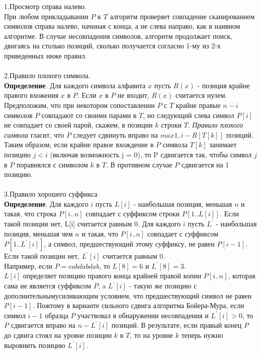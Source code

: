 \documentclass[a4paper,12pt]{article}
\begin{document}
1.Просмотр справа налево.\\
При любом прикладывании $P$ к $T$ алгоритм проверяет совпадение сканированием символов справа налево, начиная с конца, а не слева направо, как в наивном алгоритме.
В случае несовпадения символов, алгоритм продолжает поиск, двигаясь на столько позиций, сколько получается согласно 1-му из 2-х приведенных ниже правил. \\
\\
2.Правило плохого символа.\\
\textbf{Определение}. Для каждого символа алфавита $x$ пусть $R(x)$ - позиция крайне правого вхожения $x$ в $P$. Если $x$ в $P$ не входит, $R(x)$ считается нулем.\\
Предположим, что при некотором сопоставлении $P$ с $T$ крайне правые $n - i$ символов $P$ совпадают со своими парами в $T$, но следующий слева символ $P[i]$ не совпадает со своей парой, скажем, в позиции $k$ строки $T$. \textit{Правило плохого символа} гласит, что $P$ следует сдвинуть вправо на $max{1, i - R[T[k]]}$ позиций. Таким образом, если крайне правое вхождение в $P$ символа $T[k]$ занимает позицию $j < i$ (включая возможность j = 0), то P сдвигается так, чтобы символ $j$ в $P$ поравнялся с символом $k$ в $T$. В противном случае $P$ сдвигается на 1 позицию.\\
\\
3.Правило хорошего суффикса\\
\textbf{Определение}. Для каждого $i$ пусть $L[i]$ - наибольшая позиция, меньшая $n$ и такая, что строка $P[i..n]$ совпадает с суффиксом строки $P[1..L[i]]$. Если такой позиции нет, L[i] считается равным 0. Для каждого $i$ пусть $L^{\prime}$ - наибольшая позиция, меньшая чем $n$ и такая, что $P[i..n]$ совпадает с суффиксом $P[1..L^{\prime}[i]]$, а символ, предшествующий этому суффиксу, не равен $P[i - 1]$. Если такой позиции нет, $L^{\prime}[i]$ считается равным 0.\\ 
Например, если $P = cabdabdab$, то $L[8] = 6$ и $L^{\prime}[8] = 3$.\\
$L[i]$ определяет позицию правого конца крайней правой копии $P[i..n]$, которая сама не является суффиксом $P$, a $L^{\prime}[i]$ - такую же позицию с дополнительнымусиливающим условием, что предшествующий символ не равен $P[i - 1]$. Пожтому в варианте сильного сдвига алгоритма Бойера-Мура, если символ $i - 1$ образца $P$ участвовал в обнаружении несовпадения и $L^{\prime}[i] > 0$, то $P$ сдвигается вправо на $n - L^{\prime}[i]$ позиций. В результате, если правый конец $P$ до сдвига стоял на уровне позиции $k$ в $T$, то на уровне $k$ теперь нужно выровнить позицию $L^{\prime}[i]$.
\end{document}
